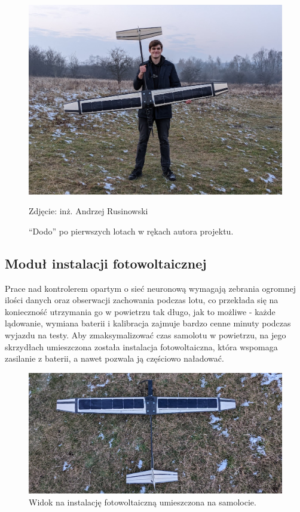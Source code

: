 \documentclass[12pt, a4paper]{article}
\begin{document}
\begin{figure}[ht]
    \centering
    \includegraphics[width=1\textwidth]{budowa16}
    \caption{``Dodo'' po pierwszych lotach w rękach autora projektu.}
    \small Zdjęcie: inż. Andrzej Rusinowski
    \label{fig:lataxd}
\end{figure}

 \FloatBarrier
\subsection{Moduł instalacji fotowoltaicznej}
Prace nad kontrolerem opartym o sieć neuronową wymagają zebrania ogromnej ilości danych oraz obserwacji zachowania podczas lotu, co przekłada się na konieczność utrzymania go w powietrzu tak długo, jak to możliwe - każde lądowanie, wymiana baterii i kalibracja zajmuje bardzo cenne minuty podczas wyjazdu na testy. Aby zmaksymalizować czas samolotu w powietrzu, na jego skrzydłach umieszczona została instalacja fotowoltaiczna, która wspomaga zasilanie z baterii, a nawet pozwala ją częściowo naładować.

\begin{figure}[ht]
    \centering
    \includegraphics[width=1\textwidth]{panelki}
    \caption{Widok na instalację fotowoltaiczną umieszczona na samolocie.}
    \label{fig:panelki}
\end{figure}
\end{document}
